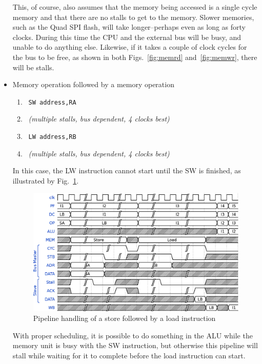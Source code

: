 \documentclass{gqtekspec}
\begin{document}
\begin{itemize}
This, of course, also assumes that the memory being accessed is a single cycle
memory and that there are no stalls to get to the memory.
Slower memories, such as the Quad SPI flash, will take longer--perhaps even
as long as forty clocks.   During this time the CPU and the external bus 
will be busy, and unable to do anything else.  Likewise, if it takes a couple
of clock cycles for the bus to be free, as shown in both Figs.~\ref{fig:memrd}
and~\ref{fig:memwr}, there will be stalls.

\item Memory operation followed by a memory operation
\begin{enumerate}
\item\ {\tt SW address,RA}
\item\ {\em (multiple stalls, bus dependent, 4 clocks best)}
\item\ {\tt LW address,RB}
\item\ {\em (multiple stalls, bus dependent, 4 clocks best)}
\end{enumerate}

In this case, the LW instruction cannot start until the SW is finished,
as illustrated by Fig.~\ref{fig:mstld}.
\begin{figure}\begin{center}
\includegraphics[width=5.5in]{../gfx/mstld.eps}
\caption{Pipeline handling of a store followed by a load instruction}\label{fig:mstld}
\end{center}\end{figure}
With proper scheduling, it is possible to do something in the ALU while the
memory unit is busy with the SW instruction, but otherwise this pipeline will
stall while waiting for it to complete before the load instruction can
start.


\end{itemize}
\end{document}

